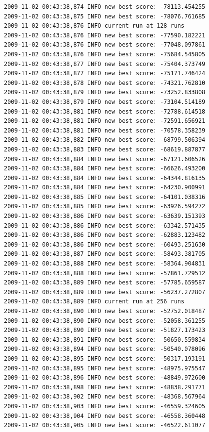 \documentclass[12pt]{article}
\begin{document}
\begin{verbatim}
2009-11-02 00:43:38,874 INFO new best score: -78113.454255
2009-11-02 00:43:38,875 INFO new best score: -78076.761685
2009-11-02 00:43:38,876 INFO current run at 128 runs
2009-11-02 00:43:38,876 INFO new best score: -77590.182221
2009-11-02 00:43:38,876 INFO new best score: -77048.097861
2009-11-02 00:43:38,876 INFO new best score: -75684.545805
2009-11-02 00:43:38,877 INFO new best score: -75404.373749
2009-11-02 00:43:38,877 INFO new best score: -75171.746424
2009-11-02 00:43:38,878 INFO new best score: -74321.762810
2009-11-02 00:43:38,879 INFO new best score: -73252.833808
2009-11-02 00:43:38,879 INFO new best score: -73104.514189
2009-11-02 00:43:38,881 INFO new best score: -72788.614518
2009-11-02 00:43:38,881 INFO new best score: -72591.656921
2009-11-02 00:43:38,881 INFO new best score: -70578.358239
2009-11-02 00:43:38,882 INFO new best score: -68799.506394
2009-11-02 00:43:38,883 INFO new best score: -68619.887877
2009-11-02 00:43:38,884 INFO new best score: -67121.606526
2009-11-02 00:43:38,884 INFO new best score: -66626.493200
2009-11-02 00:43:38,884 INFO new best score: -64344.816135
2009-11-02 00:43:38,884 INFO new best score: -64230.900991
2009-11-02 00:43:38,885 INFO new best score: -64101.038316
2009-11-02 00:43:38,885 INFO new best score: -63926.594272
2009-11-02 00:43:38,886 INFO new best score: -63639.151393
2009-11-02 00:43:38,886 INFO new best score: -63342.571435
2009-11-02 00:43:38,886 INFO new best score: -62883.123482
2009-11-02 00:43:38,886 INFO new best score: -60493.251630
2009-11-02 00:43:38,887 INFO new best score: -58493.381705
2009-11-02 00:43:38,888 INFO new best score: -58364.904831
2009-11-02 00:43:38,888 INFO new best score: -57861.729512
2009-11-02 00:43:38,889 INFO new best score: -57785.659587
2009-11-02 00:43:38,889 INFO new best score: -56237.272807
2009-11-02 00:43:38,889 INFO current run at 256 runs
2009-11-02 00:43:38,890 INFO new best score: -52752.018487
2009-11-02 00:43:38,890 INFO new best score: -52058.361255
2009-11-02 00:43:38,890 INFO new best score: -51827.173423
2009-11-02 00:43:38,891 INFO new best score: -50650.559834
2009-11-02 00:43:38,894 INFO new best score: -50540.078096
2009-11-02 00:43:38,895 INFO new best score: -50317.193191
2009-11-02 00:43:38,895 INFO new best score: -48975.975547
2009-11-02 00:43:38,896 INFO new best score: -48849.972600
2009-11-02 00:43:38,898 INFO new best score: -48838.291771
2009-11-02 00:43:38,902 INFO new best score: -48368.567964
2009-11-02 00:43:38,903 INFO new best score: -46559.324605
2009-11-02 00:43:38,904 INFO new best score: -46558.360448
2009-11-02 00:43:38,905 INFO new best score: -46522.611077

\end{verbatim}
\end{document}

